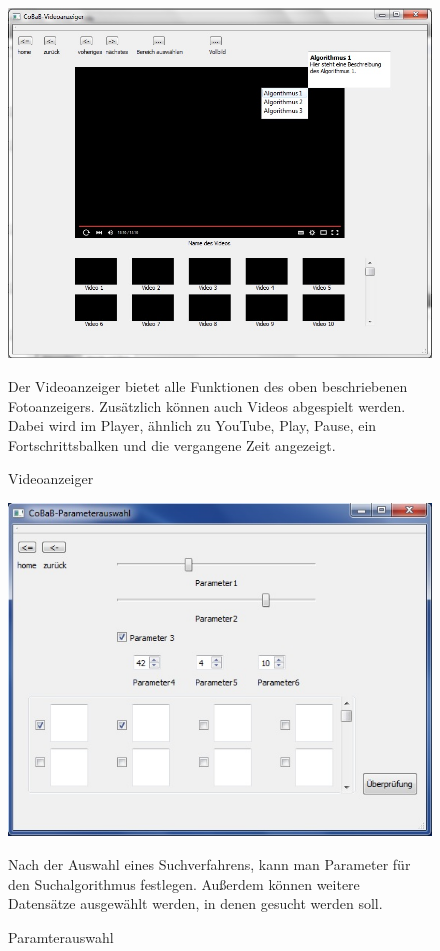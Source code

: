 \begin{figure}
\includegraphics[width=1\linewidth]{img/Videoanzeiger}
\caption{Videoanzeiger}
\label{fig:videoanzeiger}
\vspace{10pt}
Der Videoanzeiger bietet alle Funktionen des oben beschriebenen Fotoanzeigers. Zusätzlich können auch Videos abgespielt werden. Dabei wird im Player, ähnlich zu YouTube, Play, Pause, ein Fortschrittsbalken und die vergangene Zeit angezeigt. 
\end{figure}

\begin{figure}
\includegraphics[width=1\linewidth]{img/Parameterauswahl}
\caption{Paramterauswahl}
\label{fig:parameterauswahl}
\vspace{10pt}
Nach der Auswahl eines Suchverfahrens, kann man Parameter für den Suchalgorithmus festlegen. Außerdem können weitere Datensätze ausgewählt werden, in denen gesucht werden soll.
\end{figure}

